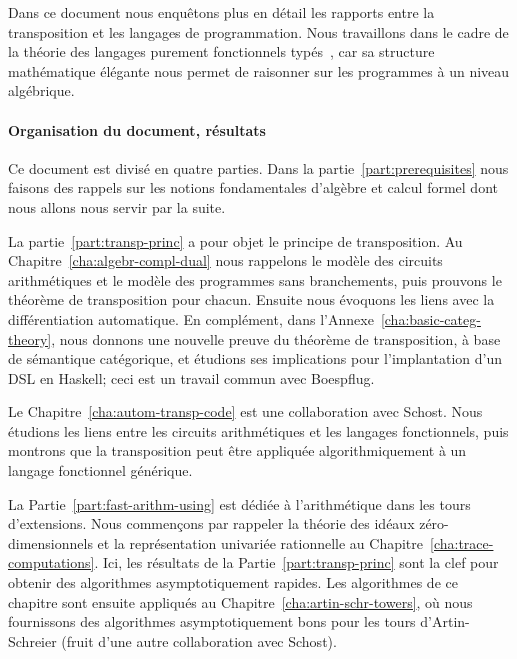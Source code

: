 Dans ce document nous enquêtons plus en détail les rapports entre la
transposition et les langages de programmation. Nous travaillons dans
le cadre de la théorie des langages purement fonctionnels
typés~\cite{pierce}, car sa structure mathématique élégante nous
permet de raisonner sur les programmes à un niveau algébrique.

\paragraph*{Organisation du document, résultats}
Ce document est divisé en quatre parties. Dans la
partie~\ref{part:prerequisites} nous faisons des rappels sur les
notions fondamentales d'algèbre et calcul formel dont nous allons nous
servir par la suite.

La partie~\ref{part:transp-princ} a pour objet le principe de
transposition. Au Chapitre~\ref{cha:algebr-compl-dual} nous rappelons
le modèle des circuits arithmétiques et le modèle des programmes sans
branchements, puis prouvons le théorème de transposition pour
chacun. Ensuite nous évoquons les liens avec la différentiation
automatique. En complément, dans
l'Annexe~\ref{cha:basic-categ-theory}, nous donnons une nouvelle
preuve du théorème de transposition, à base de sémantique catégorique,
et étudions ses implications pour l'implantation d'un DSL en Haskell;
ceci est un travail commun avec Boespflug.

Le Chapitre~\ref{cha:autom-transp-code} est une collaboration avec
Schost. Nous étudions les liens entre les circuits arithmétiques et
les langages fonctionnels, puis montrons que la transposition peut
être appliquée algorithmiquement à un langage fonctionnel générique.

La Partie~\ref{part:fast-arithm-using} est dédiée à l'arithmétique
dans les tours d'extensions. Nous commençons par rappeler la théorie
des idéaux zéro-dimensionnels et la représen\-tation univariée
rationnelle au Chapitre~\ref{cha:trace-computations}. Ici, les
résultats de la Partie~\ref{part:transp-princ} sont la clef pour
obtenir des algorithmes asymptotiquement rapides. Les algorithmes de
ce chapitre sont ensuite appliqués au
Chapitre~\ref{cha:artin-schr-towers}, où nous fournissons des
algorithmes asymptotiquement bons pour les tours d'Artin-Schreier
(fruit d'une autre collaboration avec Schost).

